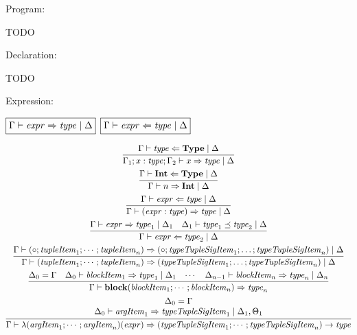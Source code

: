 Program:

TODO

Declaration:

TODO

Expression:

$\fbox{$\Gamma \vdash \mathit{expr} \Rightarrow \mathit{type} \mid \Delta$}$
$\fbox{$\Gamma \vdash \mathit{expr} \Leftarrow \mathit{type} \mid \Delta$}$

\begin{gather*}
  \infer{\Gamma_1; x: \mathit{type}; \Gamma_2 \vdash x \Rightarrow \mathit{type} \mid \Delta}{
    \Gamma \vdash \mathit{type} \Leftarrow \mathbf{Type} \mid \Delta
  }
  \\
  \infer{\Gamma \vdash n \Rightarrow \mathbf{Int} \mid \Delta}{
    \Gamma \vdash \mathbf{Int} \Leftarrow \mathbf{Type} \mid \Delta
  }
  \\
  \infer{\Gamma \vdash (\mathit{expr}: \mathit{type}) \Rightarrow \mathit{type} \mid \Delta}{
    \Gamma \vdash \mathit{expr} \Leftarrow \mathit{type} \mid \Delta
  }
  \\
  \infer{\Gamma \vdash \mathit{expr} \Leftarrow \mathit{type}_2 \mid \Delta}{
    \Gamma \vdash \mathit{expr} \Rightarrow \mathit{type}_1 \mid \Delta_1
    &
    \Delta_1 \vdash \mathit{type}_1 \preceq \mathit{type}_2 \mid \Delta
  }
  \\
  \infer{\Gamma \vdash (\mathit{tupleItem}_1; \cdots; \mathit{tupleItem}_n) \Rightarrow (\mathit{typeTupleSigItem}_1; \ldots; \mathit{typeTupleSigItem}_n) \mid \Delta}{
    \Gamma \vdash (\circ; \mathit{tupleItem}_1; \cdots; \mathit{tupleItem}_n) \Rightarrow (\circ; \mathit{typeTupleSigItem}_1; \ldots; \mathit{typeTupleSigItem}_n) \mid \Delta
  }
  \\
  \infer{\Gamma \vdash \mathbf{block}(\mathit{blockItem}_1; \cdots; \mathit{blockItem}_n) \Rightarrow \mathit{type}_n}{
    \Delta_0 = \Gamma
    &
    \Delta_0 \vdash \mathit{blockItem}_1 \Rightarrow \mathit{type}_1 \mid \Delta_1
    &
    \cdots
    &
    \Delta_{n - 1} \vdash \mathit{blockItem}_n \Rightarrow \mathit{type}_n \mid \Delta_n
  }
  \\
  \infer{\Gamma \vdash \lambda(\mathit{argItem}_1; \cdots; \mathit{argItem}_n)(\mathit{expr}) \Rightarrow (\mathit{typeTupleSigItem}_1; \cdots; \mathit{typeTupleSigItem}_n) \rightarrow \mathit{type}}{
    \begin{array}{c}
      \Delta_0 = \Gamma
      \\
      \Delta_0 \vdash \mathit{argItem}_1 \Rightarrow \mathit{typeTupleSigItem}_1 \mid \Delta_1, \Theta_1

\end{array}}
\end{gather*}
